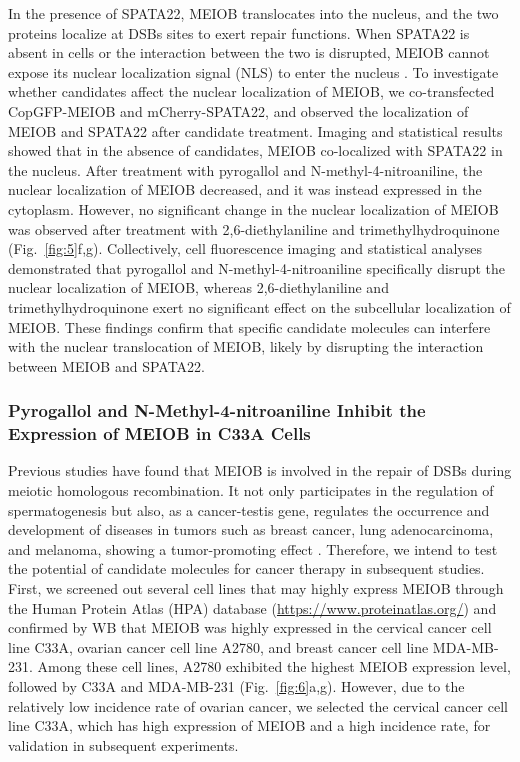 \documentclass[preprint,12pt]{elsarticle}
\theoremstyle{plain}
\theoremstyle{definition}
\theoremstyle{remark}
\begin{document}
In the presence of SPATA22, MEIOB translocates into the nucleus, and the two proteins localize at DSBs sites to exert repair functions. When SPATA22 is absent in cells or the interaction between the two is disrupted, MEIOB cannot expose its nuclear localization signal (NLS) to enter the nucleus \cite{10}. To investigate whether candidates affect the nuclear localization of MEIOB, we co-transfected CopGFP-MEIOB and mCherry-SPATA22, and observed the localization of MEIOB and SPATA22 after candidate treatment. Imaging and statistical results showed that in the absence of candidates, MEIOB co-localized with SPATA22 in the nucleus. After treatment with pyrogallol and N-methyl-4-nitroaniline, the nuclear localization of MEIOB decreased, and it was instead expressed in the cytoplasm. However, no significant change in the nuclear localization of MEIOB was observed after treatment with 2,6-diethylaniline and trimethylhydroquinone (Fig.~\ref{fig:5}f,g). Collectively, cell fluorescence imaging and statistical analyses demonstrated that pyrogallol and N-methyl-4-nitroaniline specifically disrupt the nuclear localization of MEIOB, whereas 2,6-diethylaniline and trimethylhydroquinone exert no significant effect on the subcellular localization of MEIOB. These findings confirm that specific candidate molecules can interfere with the nuclear translocation of MEIOB, likely by disrupting the interaction between MEIOB and SPATA22.


\subsubsection*{Pyrogallol and N-Methyl-4-nitroaniline Inhibit the Expression of MEIOB in C33A Cells}

Previous studies have found that MEIOB is involved in the repair of DSBs during meiotic homologous recombination. It not only participates in the regulation of spermatogenesis but also, as a cancer-testis gene, regulates the occurrence and development of diseases in tumors such as breast cancer, lung adenocarcinoma, and melanoma, showing a tumor-promoting effect \cite{18,19,20}. Therefore, we intend to test the potential of candidate molecules for cancer therapy in subsequent studies. First, we screened out several cell lines that may highly express MEIOB through the Human Protein Atlas (HPA) database (\url{https://www.proteinatlas.org/}) and confirmed by WB that MEIOB was highly expressed in the cervical cancer cell line C33A, ovarian cancer cell line A2780, and breast cancer cell line MDA-MB-231. Among these cell lines, A2780 exhibited the highest MEIOB expression level, followed by C33A and MDA-MB-231 (Fig.~\ref{fig:6}a,g). However, due to the relatively low incidence rate of ovarian cancer, we selected the cervical cancer cell line C33A, which has high expression of MEIOB and a high incidence rate, for validation in subsequent experiments.
\end{document}
